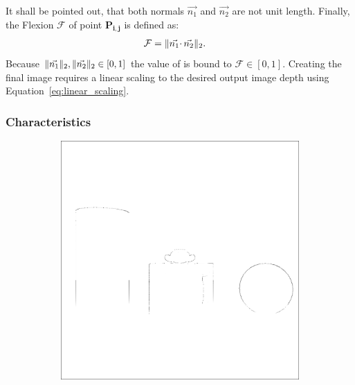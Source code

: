It shall be pointed out, that both normals $\vec{n_1}$ and $\vec{n_2}$ are not unit length.
Finally, the Flexion $\mathcal{F}$ of point $\mathbf{P_{i,j}}$ is defined as:
\begin{align}
    \mathcal{F} &= \lVert\vec{n_1} \cdotp \vec{n_2}\rVert_{2}\text{.}
\end{align}
Because $\lVert\vec{n_1}\rVert_{2},\lVert\vec{n_2}\rVert_{2} \in [0,1]$ the value of is bound to $\mathcal{F} \in [0, 1]$.
Creating the final image requires a linear scaling to the desired output image depth using Equation~\ref{eq:linear_scaling}.

\subsubsection*{Characteristics}

\begin{figure}[tb]
    \begin{subfigure}[t]{0.32\textwidth}
        \includegraphics[width=\linewidth]{chapter04/img/flexion-0001.png}
    \end{subfigure}
    \begin{subfigure}[t]{0.32\textwidth}

\end{subfigure}
\end{figure}
